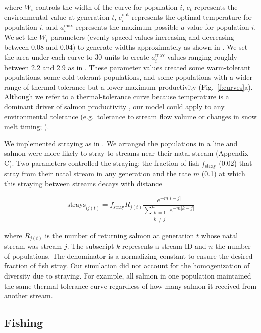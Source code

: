 \documentclass[12pt,english]{article}
\newcommand{\somstray}{Appendix C}
\begin{document}
\begin{spacing}{1.9}
\noindent
where $W_i$ controls the width of the curve for population $i$, $e_t$ represents the environmental value at generation $t$, $e_i^{\mathrm{opt}}$ represents the optimal temperature for population $i$, and $a_i^{\mathrm{max}}$ represents the maximum possible $a$ value for population $i$. We set the $W_i$ parameters (evenly spaced values increasing and decreasing between 0.08 and 0.04) to generate widths approximately as shown in \citet{eliason2011}. We set the area under each curve to 30 units to create $a_i^{\mathrm{max}}$ values ranging roughly between 2.2 and 2.9 as in \citet{dorner2008}. These parameter values created some warm-tolerant populations, some cold-tolerant populations, and some populations with a wider range of thermal-tolerance but a lower maximum productivity (Fig.~\ref{f:curves}a). Although we refer to a thermal-tolerance curve because temperature is a dominant driver of salmon productivity \citep[e.g.][]{mccullough1999, patterson2007, eliason2011}, our model could apply to any environmental tolerance (e.g.~tolerance to stream flow volume or changes in snow melt timing; \citeauthor{crozier2008} \citeyear{crozier2008}).

We implemented straying as in \citet{cooper1999}. We arranged the populations in a line and salmon were more likely to stray to streams near their natal stream (\somstray). Two parameters controlled the straying: the fraction of fish $f_{\mathrm{stray}}$ (0.02) that stray from their natal stream in any generation and the rate $m$ (0.1) at which this straying between streams decays with distance

\[\mathrm{strays}_{ij(t)} = f_{\mathrm{stray}} R_{j(t)} \frac{e^{-m \lvert i-j
\rvert }} {\displaystyle\sum\limits_{ \substack{k = 1 \\ k \neq j}}^{n} e^{-m
\lvert k-j \rvert }}\]

\noindent
where $R_{j(t)}$ is the number of returning salmon at generation $t$ whose natal stream was stream $j$. The subscript $k$ represents a stream ID and $n$ the number of populations. The denominator is a normalizing constant to ensure the desired fraction of fish stray. Our simulation did not account for the homogenization of diversity due to straying. For example, all salmon in one population maintained the same thermal-tolerance curve regardless of how many salmon it received from another stream.

\subsection{Fishing}\label{fishing}


\end{spacing}
\end{document}
